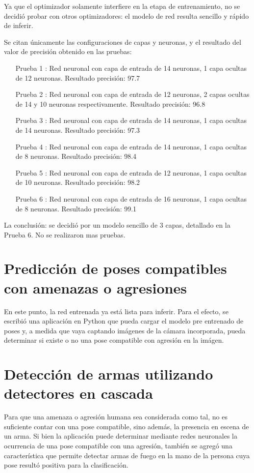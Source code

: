 \documentclass[a4paper,12pt,oneside,spanish]{book}
\begin{document}
Ya que el optimizador solamente interfiere en la etapa de entrenamiento, no se decidió probar con otros optimizadores: el modelo de red resulta sencillo y rápido de inferir.\par

Se citan únicamente las configuraciones de capas y neuronas, y el resultado del valor de precisión obtenido en las pruebas:
\begin{enumerate}\baselineskip 16pt	
	\item[Prueba 1]: 
	Red neuronal con capa de entrada de 14 neuronas, 1 capa ocultas de 12 neuronas. Resultado precisión: 97.7%
	\item[Prueba 2]: 
	Red neuronal con capa de entrada de 12 neuronas, 2 capas ocultas de 14 y 10 neuronas respectivamente. Resultado precisión: 96.8%
	\item[Prueba 3]: 
	Red neuronal con capa de entrada de 14 neuronas, 1 capa ocultas de 14 neuronas. Resultado precisión: 97.3%
	\item[Prueba 4]: 
	Red neuronal con capa de entrada de 14 neuronas, 1 capa ocultas de 8 neuronas. Resultado precisión: 98.4%
	\item[Prueba 5]: 
	Red neuronal con capa de entrada de 12 neuronas, 1 capa ocultas de 10 neuronas. Resultado precisión: 98.2%
	\item[Prueba 6]: 
	Red neuronal con capa de entrada de 16 neuronas, 1 capa ocultas de 8 neuronas. Resultado precisión: 99.1%
\end{enumerate}	\baselineskip 16pt

La conclusión: se decidió por un modelo sencillo de 3 capas, detallado en la Prueba 6. No se realizaron mas pruebas.

\section{Predicción de poses compatibles con amenazas o agresiones}
En este punto, la red entrenada ya está lista para inferir. Para el efecto, se escribió una aplicación en Python que pueda cargar el modelo pre entrenado de poses y, a medida que vaya captando imágenes de la cámara incorporada, pueda determinar si existe o no una pose compatible con agresión en la imágen.\par

\section{Detección de armas utilizando detectores en cascada}
Para que una amenaza o agresión humana sea considerada como tal, no es suficiente contar con una pose compatible, sino además, la presencia en escena de un arma. Si bien la aplicación puede determinar mediante redes neuronales la ocurrencia de una pose compatible con una agresión, también se agregó una característica que permite detectar armas de fuego en la mano de la persona cuya pose resultó positiva para la clasificación.\par
\end{document}
